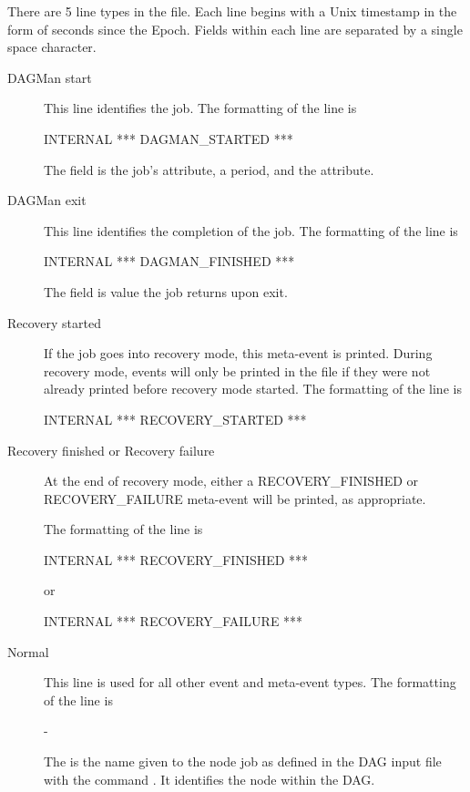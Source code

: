 There are 5 line types in the  file.
Each line begins with a Unix timestamp in the form of seconds since the Epoch.
Fields within each line are separated by a single space character.
\begin{description}

\item [DAGMan start] 
This line identifies the  job.
The formatting of the line is

 INTERNAL *** DAGMAN\_STARTED  ***

The  field is the  job's 
 attribute, a period, and the  attribute. 

\item [DAGMan exit] 
This line identifies the completion of the  job.
The formatting of the line is

 INTERNAL *** DAGMAN\_FINISHED  ***

The  field is value the  job returns upon exit. 

\item [Recovery started] 
If the  job goes into recovery mode,
this meta-event is printed.
During recovery mode, events will only be printed in the file
if they were not already printed before recovery mode started.
The formatting of the line is

 INTERNAL *** RECOVERY\_STARTED ***

\item [Recovery finished or Recovery failure] 
At the end of recovery
mode, either a RECOVERY\_FINISHED or RECOVERY\_FAILURE meta-event will be
printed, as appropriate.

The formatting of the line is

 INTERNAL *** RECOVERY\_FINISHED ***

or

 INTERNAL *** RECOVERY\_FAILURE ***

\item [Normal]
This line is used for all other event and meta-event types.
The formatting of the line is

     - 

The  is the name given to the node job as defined in
the DAG input file with the command .
It identifies the node within the DAG.


\end{description}
